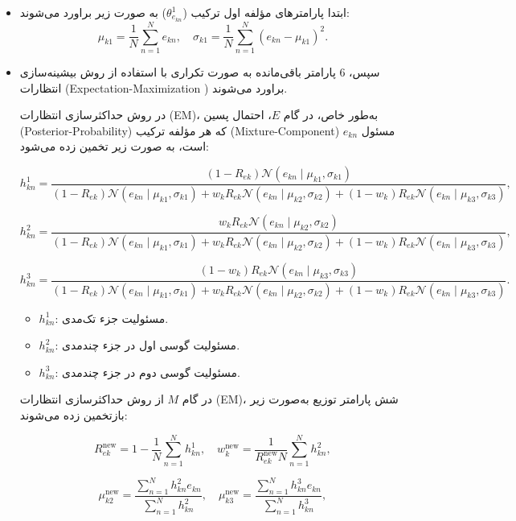 \documentclass[a4paper,12pt,openany]{report}
\begin{document}
\begin{itemize}
	\item ابتدا پارامترهای مؤلفه اول ترکیب (\( \theta_{e_{kn}}^1 \)) به صورت زیر براورد می‌شوند:
	\[
	\mu_{k1} = \frac{1}{N} \sum_{n=1}^N e_{kn}, \quad \sigma_{k1} = \frac{1}{N} \sum_{n=1}^N (e_{kn} - \mu_{k1})^2.
	\]
	\item سپس، 6 پارامتر باقی‌مانده به صورت تکراری با استفاده از روش بیشینه‌سازی انتظارات (Expectation-Maximization ) براورد می‌شوند.
	
	در روش حداکثرسازی انتظارات (EM)، به‌طور خاص، در گام \( E \)، احتمال پسین (Posterior-Probability) که هر مؤلفه ترکیب (Mixture-Component) مسئول \( e_{kn} \) است، به صورت زیر تخمین زده می‌شود:
	
	
	\[
	h_{kn}^1 = \frac{(1 - R_{ek}) \mathcal{N}(e_{kn} \mid \mu_{k1}, \sigma_{k1})}
	{(1 - R_{ek}) \mathcal{N}(e_{kn} \mid \mu_{k1}, \sigma_{k1}) + w_k R_{ek} \mathcal{N}(e_{kn} \mid \mu_{k2}, \sigma_{k2}) + (1 - w_k) R_{ek} \mathcal{N}(e_{kn} \mid \mu_{k3}, \sigma_{k3})},
	\]
	
	\[
	h_{kn}^2 = \frac{w_k R_{ek} \mathcal{N}(e_{kn} \mid \mu_{k2}, \sigma_{k2})}
	{(1 - R_{ek}) \mathcal{N}(e_{kn} \mid \mu_{k1}, \sigma_{k1}) + w_k R_{ek} \mathcal{N}(e_{kn} \mid \mu_{k2}, \sigma_{k2}) + (1 - w_k) R_{ek} \mathcal{N}(e_{kn} \mid \mu_{k3}, \sigma_{k3})},
	\]
	
	\[
	h_{kn}^3 = \frac{(1 - w_k) R_{ek} \mathcal{N}(e_{kn} \mid \mu_{k3}, \sigma_{k3})}
	{(1 - R_{ek}) \mathcal{N}(e_{kn} \mid \mu_{k1}, \sigma_{k1}) + w_k R_{ek} \mathcal{N}(e_{kn} \mid \mu_{k2}, \sigma_{k2}) + (1 - w_k) R_{ek} \mathcal{N}(e_{kn} \mid \mu_{k3}, \sigma_{k3})}.
	\]
	\begin{itemize}
		\item \( h_{kn}^1 \): مسئولیت جزء تک‌مدی.
		\item \( h_{kn}^2 \): مسئولیت گوسی اول در جزء چندمدی.
		\item \( h_{kn}^3 \): مسئولیت گوسی دوم در جزء چندمدی.
	\end{itemize}
	
	در گام \( M \) از روش حداکثرسازی انتظارات (EM)، شش پارامتر توزیع به‌صورت زیر بازتخمین زده می‌شوند:
	
	\[
	R_{ek}^{\text{new}} = 1 - \frac{1}{N} \sum_{n=1}^N h_{kn}^1, \quad w_k^{\text{new}} = \frac{1}{R_{ek}^{\text{new}} N} \sum_{n=1}^N h_{kn}^2,
	\]
	
	\[
	\mu_{k2}^{\text{new}} = \frac{\sum_{n=1}^N h_{kn}^2 e_{kn}}{\sum_{n=1}^N h_{kn}^2}, \quad \mu_{k3}^{\text{new}} = \frac{\sum_{n=1}^N h_{kn}^3 e_{kn}}{\sum_{n=1}^N h_{kn}^3},
	\]
	

\end{itemize}
\end{document}

